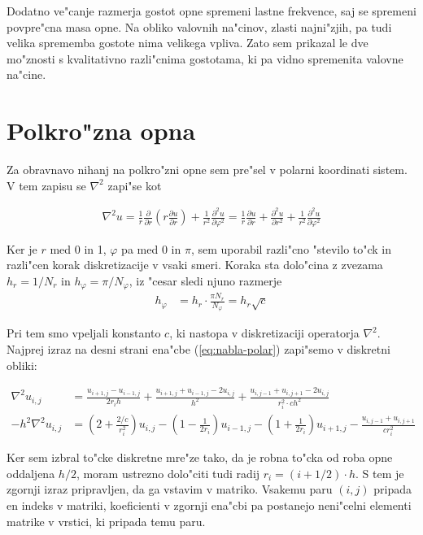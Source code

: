 \documentclass[a4paper,10pt]{article}
\renewcommand{\phi}{\varphi}
\newcommand{\parcialno}[2]{
  \frac{\partial #1}{\partial #2}
}
\newcommand{\parcdva}[2]{
  \frac{\partial^2 #1}{\partial #2 ^2}
}
\begin{document}
Dodatno ve"canje razmerja gostot opne spremeni lastne frekvence, saj se spremeni povpre"cna masa opne. Na obliko valovnih na"cinov, zlasti najni"zjih, pa tudi velika sprememba gostote nima velikega vpliva. Zato sem prikazal le dve mo"znosti s kvalitativno razli"cnima gostotama, ki pa vidno spremenita valovne na"cine. 

\section{Polkro"zna opna}

Za obravnavo nihanj na polkro"zni opne sem pre"sel v polarni koordinati sistem. V tem zapisu se $\nabla^2$ zapi"se kot

\begin{align}
\label{eq:nabla-polar}
  \nabla^2 u = \frac{1}{r}\parcialno{}{r}\left(r\parcialno{u}{r}\right) + \frac{1}{r^2} \parcdva{u}{\phi} 
  = \frac{1}{r}\parcialno{u}{r} + \parcdva{u}{r} + \frac{1}{r^2} \parcdva{u}{\phi} 
\end{align}

Ker je $r$ med 0 in 1, $\phi$ pa med 0 in $\pi$, sem uporabil razli"cno "stevilo to"ck in razli"cen korak diskretizacije v vsaki smeri. Koraka sta dolo"cina z zvezama $h_r = 1/N_r$ in $h_\phi = \pi/N_\phi$, iz "cesar sledi njuno razmerje
\begin{align}
h_\phi &= h_r \cdot \frac{\pi N_r}{N_\phi} = h_r \sqrt{c}
\end{align}

Pri tem smo vpeljali konstanto $c$, ki nastopa v diskretizaciji operatorja $\nabla^2$. Najprej izraz na desni strani ena"cbe (\ref{eq:nabla-polar}) zapi"semo v diskretni obliki:

\begin{align}
  \nabla^2 u_{i,j} &= \frac{u_{i+1,j} - u_{i-1,j}}{2 r_i h} + \frac{u_{i+1,j} + u_{i-1,j} - 2u_{i,j}}{h^2} + \frac{u_{i,j-1} + u_{i,j+1} - 2u_{i,j}}{r_i^2 \cdot ch^2} \\
  -h^2\nabla^2 u_{i,j} &= \left(2 + \frac{2/c}{r_i^2}\right)u_{i,j} - \left( 1 - \frac{1}{2r_i} \right) u_{i-1,j} - \left( 1 + \frac{1}{2r_i} \right) u_{i+1,j} - \frac{u_{i,j-1} + u_{i,j+1}}{c r_i^2}
\end{align}

Ker sem izbral to"cke diskretne mre"ze tako, da je robna to"cka od roba opne oddaljena $h/2$, moram ustrezno dolo"citi tudi radij $r_i = (i+1/2)\cdot h$. S tem je zgornji izraz pripravljen, da ga vstavim v matriko. Vsakemu paru $(i,j)$ pripada en indeks v matriki, koeficienti v zgornji ena"cbi pa postanejo neni"celni elementi matrike v vrstici, ki pripada temu paru. 
\end{document}
